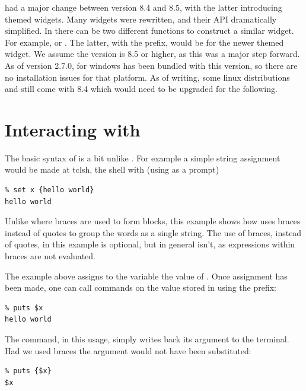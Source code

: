 \TK\/ had a major change between version 8.4 and 8.5, with the latter
introducing themed widgets. Many widgets were rewritten, and their API
dramatically simplified. In  there can be two different
functions to construct a similar widget. For example,
 or . The latter, with the
 prefix, would be for the newer themed widget. We assume the
\TK\/ version is 8.5 or higher, as this was a major step forward. As
of version 2.7.0, \R\/ for windows has been bundled with this \TK\/
version, so there are no installation issues for that platform. As of
writing, some linux distributions and \OSX\/ still come with 8.4 which
would need to be upgraded for the following.




\section{Interacting with \TCL}
\label{sec:tcltk:interacting-with-tcl}


 The basic syntax of \TCL\/ is a bit unlike \R. For
example a simple string assignment would be made at tclsh, the \TCL\/
shell with (using \code{\%} as a prompt)
\begin{verbatim}
% set x {hello world}
hello world
\end{verbatim}
Unlike \R\/ where braces are used to form blocks, this example shows
how \TCL\/ uses braces instead of quotes to group the words as a
single string. The use of braces, instead of quotes, in this example
is optional, but in general isn't, as expressions within braces are
not evaluated.  

The example above assigns to the variable  the
value of . Once assignment has been made, one can
call commands on the value stored in  using the \code{\$}
prefix:
\begin{verbatim}
% puts $x
hello world
\end{verbatim}
The  command, in this usage, simply writes back its argument to the terminal. Had
we used braces the argument would not have been substituted:
\begin{verbatim}
% puts {$x}
$x
\end{verbatim}

